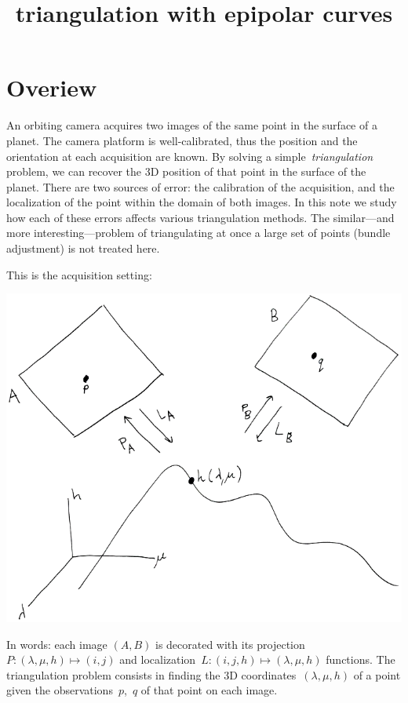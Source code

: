 \title{triangulation with epipolar curves}



\newcommand{\1}{\mathbf{1}}
\newcommand{\R}{\mathbf{R}}
\newcommand{\T}{\mathbf{T}}
\newcommand{\Z}{\mathbf{Z}}
\newcommand{\ud}{\mathrm{d}}
\newcommand{\ds}{\displaystyle}
\def\argmin{\mathop{\rm argmin}}


\section{Overiew}

An orbiting camera acquires two images of the same point in the surface of a
planet.  The camera platform is well-calibrated, thus the position and the
orientation at each acquisition are known.  By solving a
simple~\emph{triangulation} problem, we can recover the 3D position of that
point in the surface of the planet.
There are two sources of error: the calibration of the acquisition, and the
localization of the point within the domain of both images.  In this note we
study how each of these errors affects various triangulation methods.
The similar---and more interesting---problem of triangulating at once a large
set of points (bundle adjustment) is not treated here.

This is the acquisition setting:
\begin{center}
	\includegraphics[width=0.6\linewidth]{tworpcs.png}
\end{center}
In words: each image $(A,B)$ is decorated with its
projection~$P:(\lambda,\mu,h)\mapsto(i,j)$ and
localization~$L:(i,j,h)\mapsto(\lambda,\mu,h)$ functions.  The triangulation
problem consists in finding the 3D coordinates~$(\lambda,\mu,h)$ of a point
given the observations~$p$,~$q$ of that point on each image.


